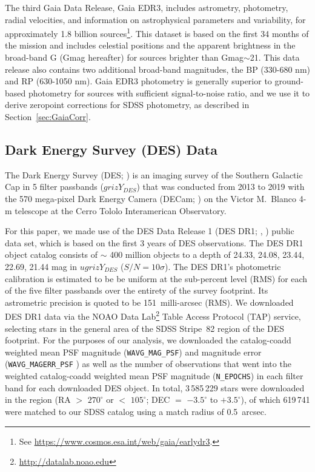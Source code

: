 \documentclass[fleqn,usenatbib]{mnras}
\begin{document}
The third Gaia Data Release, Gaia EDR3, includes astrometry, photometry, radial velocities, and information on astrophysical parameters and variability, for approximately 1.8 billion sources\footnote{See \url{https://www.cosmos.esa.int/web/gaia/earlydr3}.}. This dataset is based on the first 34 months of the mission and includes celestial positions and the apparent brightness in the broad-band G (Gmag hereafter) for sources brighter than Gmag$\sim$21.  This data release also contains two additional broad-band magnitudes, the BP (330-680 nm) and RP (630-1050 nm). Gaia EDR3 photometry is generally superior to ground-based photometry for sources with sufficient signal-to-noise ratio, and we use it to derive zeropoint corrections for SDSS photometry, as described in Section~\ref{sec:GaiaCorr}. 
 

\subsection{Dark Energy Survey (DES) Data} \label{ssec:des}


The Dark Energy Survey (DES; \citealt{2016MNRAS.460.1270D}) is an imaging survey of the Southern Galactic Cap in 5 filter passbands ($grizY_{DES}$) that was conducted from 2013 to 2019 with the 570 mega-pixel Dark Energy Camera (DECam;
\citealt{2008arXiv0810.3600H,2015AJ....150..150F}) on the Victor M.\ Blanco 4-m telescope at the Cerro Tololo Interamerican
Observatory.

For this paper, we made use of the DES Data Release 1 (DES DR1; \citealt{Morg2018}, \citealt{2018ApJS..239...18A}) public data set, which is based on the first 3 years of DES observations.  The DES DR1 object catalog consists of $\sim$ 400 million objects to a depth of 24.33, 24.08, 23.44, 22.69, 21.44 mag in $ugrizY_{DES}$ ($S/N=10\sigma$).  The DES DR1's photometric calibration is estimated to be be uniform at the sub-percent level (RMS) for each of the five filter passbands over the entirety of the survey footprint.  Its astrometric precision is quoted to be 151~milli-arcsec (RMS).  We downloaded DES DR1 data via the NOAO
Data Lab\footnote{\url{http://datalab.noao.edu}} Table Access Protocol (TAP) service, selecting stars in the general area of the SDSS Stripe~82 region of the DES footprint.  For the purposes of our analysis, we downloaded the catalog-coadd weighted mean PSF magnitude ({\tt WAVG\_MAG\_PSF}) and magnitude error ({\tt WAVG\_MAGERR\_PSF} ) as well as the number of observations that went into the weighted catalog-coadd weighted mean PSF magnitude ({\tt N\_EPOCHS}) in each filter band for each downloaded DES object.  In total, 3\,585\,229 stars were downloaded in the region (RA $>$ $270^{\circ}$ or $<$  $105^{\circ}$; DEC $=$ $-3.5^{\circ}$ to $+3.5^{\circ}$), of which 619\,741 were matched to our SDSS catalog using a match radius of 0.5~arcsec.
\end{document}
